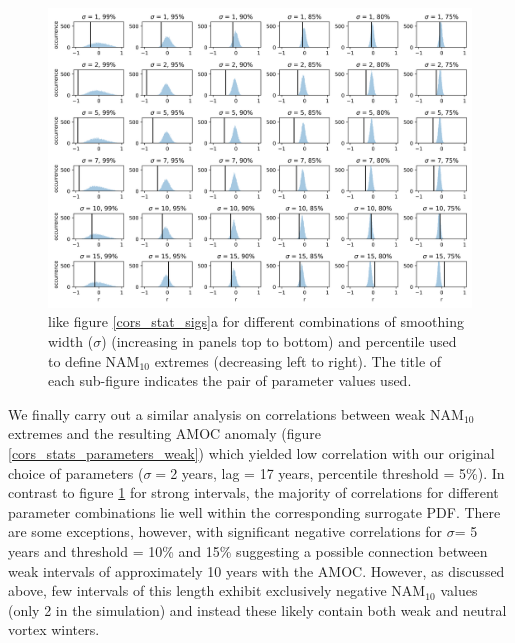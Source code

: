 \newpage
\begin{landscape}
\begin{figure}[h!]
\begin{center}
\noindent\includegraphics[width =0.9\linewidth]{Figures/Figures-surface/cors_sigs_thresh_and_sigma.png} 
\caption[PDFs for correlations between the magnitude of strong NAM$_{10}$ extreme and lagged AMOC for different $\sigma$ and threshold]{like figure \ref{cors_stat_sigs}a for different combinations of smoothing width ($\sigma$) (increasing in panels top to bottom) and percentile used to define NAM$_{10}$ extremes (decreasing left to right). The title of each sub-figure indicates the pair of parameter values used.}%
\label{cors_stats_parameters_strong}
\end{center}
\end{figure}
\end{landscape}

We finally carry out a similar analysis on correlations between weak NAM$_{10}$ extremes and the resulting AMOC anomaly (figure \ref{cors_stats_parameters_weak}) which yielded low correlation with our original choice of parameters ($\sigma =$2 years, lag = 17 years, percentile threshold = 5\%). In contrast to figure \ref{cors_stats_parameters_strong} for strong intervals, the majority of correlations for different parameter combinations lie well within the corresponding surrogate PDF. There are some exceptions, however, with significant negative correlations for $\sigma$= 5 years and threshold = 10\% and 15\% suggesting a possible connection between weak intervals of approximately 10 years with the AMOC. However, as discussed above, few intervals of this length exhibit exclusively negative NAM$_{10}$ values (only 2 in the simulation) and instead these likely contain both weak and neutral vortex winters. 

